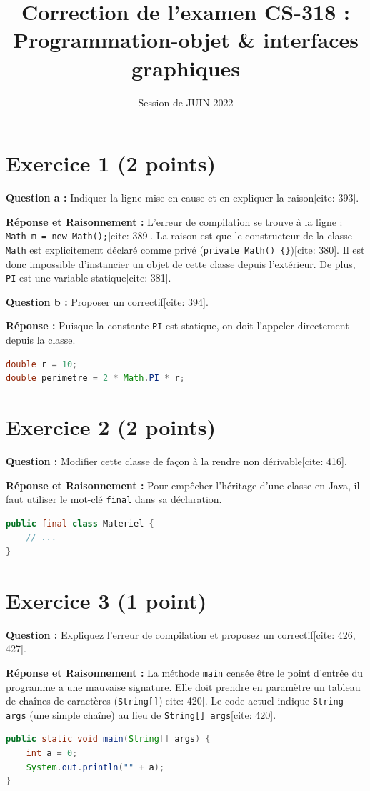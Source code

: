\documentclass[11pt,a4paper]{article}
\title{Correction de l'examen CS-318 : Programmation-objet \& interfaces graphiques}
\author{Session de JUIN 2022}
\date{}
\begin{document}
\maketitle

\section*{Exercice 1 (2 points)}
\textbf{Question a :} Indiquer la ligne mise en cause et en expliquer la raison[cite: 393].

\textbf{Réponse et Raisonnement :} 
L'erreur de compilation se trouve à la ligne : \texttt{Math m = new Math();}[cite: 389]. 
La raison est que le constructeur de la classe \texttt{Math} est explicitement déclaré comme privé (\texttt{private Math() \{\}})[cite: 380]. Il est donc impossible d'instancier un objet de cette classe depuis l'extérieur. De plus, \texttt{PI} est une variable statique[cite: 381].

\textbf{Question b :} Proposer un correctif[cite: 394].

\textbf{Réponse :} Puisque la constante \texttt{PI} est statique, on doit l'appeler directement depuis la classe.
\begin{lstlisting}[language=Java]
double r = 10;
double perimetre = 2 * Math.PI * r;
\end{lstlisting}

\section*{Exercice 2 (2 points)}
\textbf{Question :} Modifier cette classe de façon à la rendre non dérivable[cite: 416].

\textbf{Réponse et Raisonnement :} 
Pour empêcher l'héritage d'une classe en Java, il faut utiliser le mot-clé \texttt{final} dans sa déclaration.
\begin{lstlisting}[language=Java]
public final class Materiel {
    // ...
}
\end{lstlisting}

\section*{Exercice 3 (1 point)}
\textbf{Question :} Expliquez l'erreur de compilation et proposez un correctif[cite: 426, 427].

\textbf{Réponse et Raisonnement :} 
La méthode \texttt{main} censée être le point d'entrée du programme a une mauvaise signature. Elle doit prendre en paramètre un tableau de chaînes de caractères (\texttt{String[]})[cite: 420]. Le code actuel indique \texttt{String args} (une simple chaîne) au lieu de \texttt{String[] args}[cite: 420].
\begin{lstlisting}[language=Java]
public static void main(String[] args) {
    int a = 0;
    System.out.println("" + a);
}
\end{lstlisting}
\end{document}
